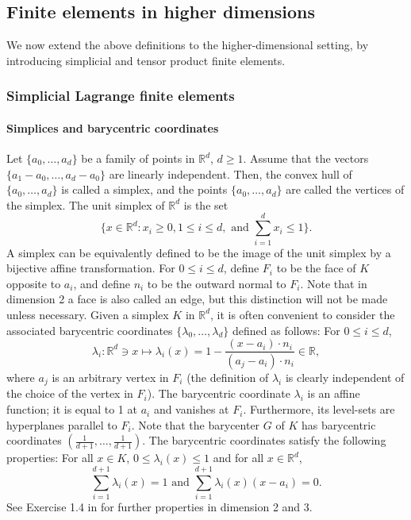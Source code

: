 \documentclass{article}
\begin{document}
\subsection{Finite elements in higher dimensions}
We now extend the above definitions to the higher-dimensional setting, by introducing simplicial and tensor product finite elements.
\subsubsection{Simplicial Lagrange finite elements}
\paragraph{Simplices and barycentric coordinates} Let $\{a_0, \dots, a_d\}$ be a family of points in $\mathbb{R}^d$, $d \ge 1$. Assume that the vectors $\{a_1 - a_0, \dots, a_d - a_0\}$ are linearly independent. Then, the convex hull of $\{a_0, \dots, a_d\}$ is called a simplex, and the points $\{a_0, \dots, a_d\}$ are called the vertices of the simplex. The unit simplex of $\mathbb{R}^d$ is the set
$$ \{x \in \mathbb{R}^d: x_i \ge 0, 1 \le i \le d, \text{ and } \sum_{i=1}^d x_i \le 1 \}. $$
A simplex can be equivalently defined to be the image of the unit simplex by a bijective affine transformation. For $0 \le i \le d$, define $F_i$ to be the face of $K$ opposite to $a_i$, and define $n_i$ to be the outward normal to $F_i$. Note that in dimension 2 a face is also called an edge, but this distinction will not be made unless necessary.
Given a simplex $K$ in $\mathbb{R}^d$, it is often convenient to consider the associated barycentric coordinates $\{\lambda_0, \dots, \lambda_d\}$ defined as follows: For $0 \le i \le d$,
\begin{equation*}\label{eq:barycentric_coords}
    \lambda_i: \mathbb{R}^d \ni x \mapsto \lambda_i(x) = 1 - \frac{(x - a_i) \cdot n_i}{(a_j - a_i) \cdot n_i} \in \mathbb{R},
\end{equation*}
where $a_j$ is an arbitrary vertex in $F_i$ (the definition of $\lambda_i$ is clearly independent of the choice of the vertex in $F_i$). The barycentric coordinate $\lambda_i$ is an affine function; it is equal to 1 at $a_i$ and vanishes at $F_i$. Furthermore, its level-sets are hyperplanes parallel to $F_i$. Note that the barycenter $G$ of $K$ has barycentric coordinates $(\frac{1}{d+1}, \dots, \frac{1}{d+1})$. The barycentric coordinates satisfy the following properties: For all $x \in K$, $0 \le \lambda_i(x) \le 1$ and for all $x \in \mathbb{R}^d$,
$$ \sum_{i=1}^{d+1} \lambda_i(x) = 1 \text{ and } \sum_{i=1}^{d+1} \lambda_i(x) (x - a_i) = 0. $$
See Exercise 1.4 in \cite{ern2004theory} for further properties in dimension 2 and 3.
\end{document}
